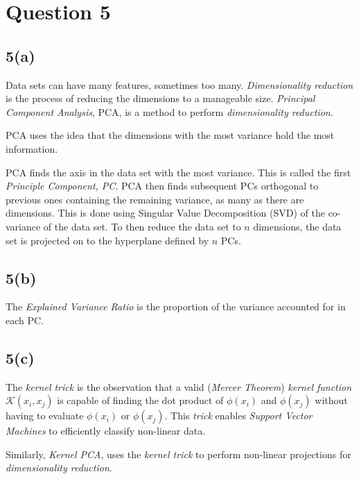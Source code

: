 \documentclass[12pt, a4paper,reqno]{article}
\begin{document}


%
%
\clearpage\section*{Question 5}

\subsection*{5(a)}

Data sets can have many features, sometimes too many. \emph{Dimensionality reduction} is the process of reducing the dimensions to a manageable size. \emph{Principal Component Analysis}, PCA, is a method to perform \emph{dimensionality reduction}.

PCA uses the idea that the dimensions with the most variance hold the most information.

PCA finds the axis in the data set with the most variance. This is called the first \emph{Principle Component, PC}. PCA then finds subsequent PCs orthogonal to previous ones containing the remaining variance, as many as there are dimensions. This is done using Singular Value Decomposition (SVD) of the co-variance of the data set. To then reduce the data set to $n$ dimensions, the data set is projected on to the hyperplane defined by $n$ PCs.

\subsection*{5(b)}

The \emph{Explained Variance Ratio} is the proportion of the variance accounted for in each PC. 

\subsection*{5(c)}

The \emph{kernel trick} is the observation that a valid (\emph{Mercer Theorem}) \emph{kernel function} $\mathcal{K}(x_i, x_j)$ is capable of finding the dot product of $\phi(x_i)$ and $\phi(x_j)$ without having to evaluate $\phi(x_i)$ or $\phi(x_j)$. This \emph{trick} enables \emph{Support Vector Machines} to efficiently classify non-linear data.

Similarly, \emph{Kernel PCA}, uses the \emph{kernel trick} to perform non-linear projections for \emph{dimensionality reduction}.
\end{document}

